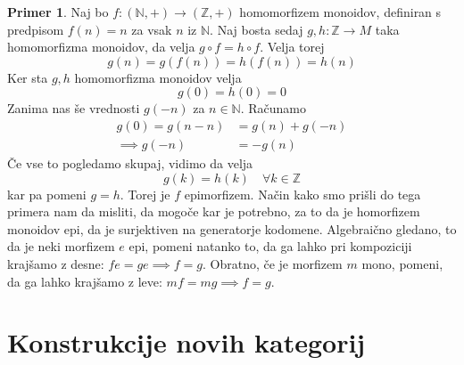 \documentclass[12pt,a4paper]{book}
\theoremstyle{definition}
\theoremstyle{plain}
\theoremstyle{definition}
\newtheorem{primer}{Primer}[section]
\theoremstyle{remark}
\begin{document}
\begin{primer}
Naj bo $f : (\mathbb{N},+) \to (\mathbb{Z},+)$ homomorfizem monoidov, definiran s predpisom $f(n) = n$ za vsak $n$ iz $\mathbb{N}$. Naj bosta sedaj $g,h: \mathbb{Z} \to M$ taka homomorfizma monoidov, da velja $g \circ f = h \circ f$. 
Velja torej 
$$g(n) = g(f(n)) = h(f(n)) = h(n)$$
Ker sta $g,h$ homomorfizma monoidov velja
$$g(0) = h(0) = 0$$
Zanima nas še vrednosti $g(-n)$ za $n \in \mathbb{N}$. 
Računamo 
\begin{align*}
g(0) = g(n - n) &= g(n) + g(-n) \\
\implies g(-n) &= -g(n)
\end{align*}
Če vse to pogledamo skupaj, vidimo da velja
$$g(k) = h(k) \quad \forall k \in \mathbb{Z}$$
kar pa pomeni $g = h$. Torej je $f$ epimorfizem. Način kako smo prišli do tega primera nam da misliti, da mogoče kar je potrebno, za to da je homorfizem monoidov epi, da je surjektiven na generatorje kodomene.
Algebraično gledano, to da je neki morfizem $e$ epi, pomeni natanko to, da ga lahko pri kompoziciji krajšamo z desne: $fe = ge \implies f=g$. Obratno, če je morfizem $m$ mono, pomeni, da ga lahko krajšamo z leve: $mf = mg \implies f = g$.

\end{primer}


\section{Konstrukcije novih kategorij}
\end{document}
